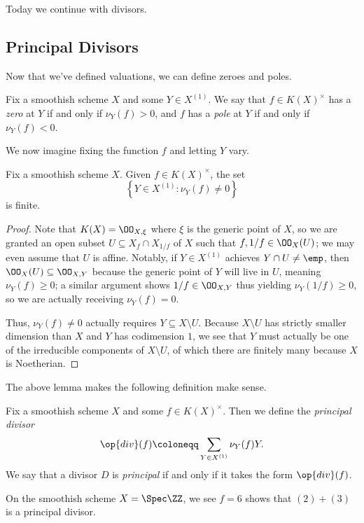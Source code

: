 \documentclass[../notes.tex]{subfiles}
\begin{document}
Today we continue with divisors.

\subsection{Principal Divisors}
Now that we've defined valuations, we can define zeroes and poles.
\begin{defihelper}  
	Fix a smoothish scheme $X$ and some $Y\in X^{(1)}$. We say that $f\in K(X)^\times$ has a \textit{zero} at $Y$ if and only if $\nu_Y(f)>0$, and $f$ has a \textit{pole} at $Y$ if and only if $\nu_Y(f)<0$.
\end{defihelper}
We now imagine fixing the function $f$ and letting $Y$ vary.
\begin{lemma} \label{lem:function-has-finite-supp}
	Fix a smoothish scheme $X$. Given $f\in K(X)^\times$, the set
	\[\left\{Y\in X^{(1)}:\nu_Y(f)\ne0\right\}\]
	is finite.
\end{lemma}
\begin{proof}
	Note that $K(X)=\OO_{X,\xi}$ where $\xi$ is the generic point of $X$, so we are granted an open subset $U\subseteq X_f\cap X_{1/f}$ of $X$ such that $f,1/f\in \OO_X(U)$; we may even assume that $U$ is affine. Notably, if $Y\in X^{(1)}$ achieves $Y\cap U\ne\emp$, then $\OO_X(U)\subseteq\OO_{X,Y}$ because the generic point of $Y$ will live in $U$, meaning $\nu_Y(f)\ge0$; a similar argument shows $1/f\in\OO_{X,Y}$ thus yielding $\nu_Y(1/f)\ge0$, so we are actually receiving $\nu_Y(f)=0$.

	Thus, $\nu_Y(f)\ne0$ actually requires $Y\subseteq X\setminus U$. Because $X\setminus U$ has strictly smaller dimension than $X$ and $Y$ has codimension $1$, we see that $Y$ must actually be one of the irreducible components of $X\setminus U$, of which there are finitely many because $X$ is Noetherian.
\end{proof}
The above lemma makes the following definition make sense.
\begin{defihelper}[principal] 
	Fix a smoothish scheme $X$ and some $f\in K(X)^\times$. Then we define the \textit{principal divisor}
	\[\op{div}(f)\coloneqq\sum_{Y\in X^{(1)}}\nu_Y(f)Y.\]
	We say that a divisor $D$ is \textit{principal} if and only if it takes the form $\op{div}(f)$.
\end{defihelper}
\begin{example}
	On the smoothish scheme $X=\Spec\ZZ$, we see $f=6$ shows that $(2)+(3)$ is a principal divisor.
\end{example}
\end{document}
